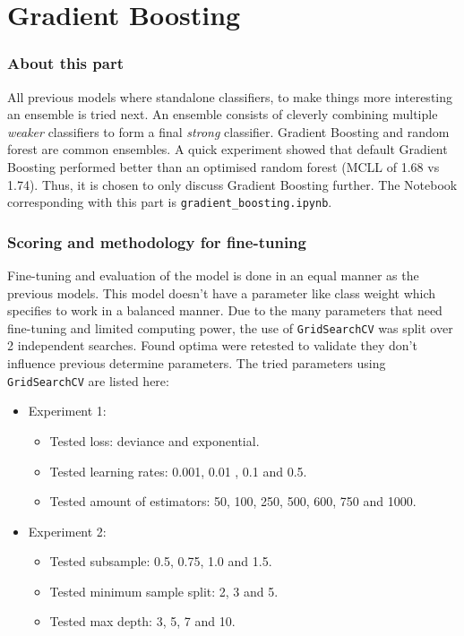 \part{Gradient Boosting}
\label{part:gradien_boost}


\section{About this part}
\label{section:gb_about_part}

All previous models where standalone classifiers, to make things more interesting an ensemble is tried next.
An ensemble consists of cleverly combining multiple \textit{weaker} classifiers to form a final \textit{strong} classifier.
Gradient Boosting and random forest are common ensembles.
A quick experiment showed that default Gradient Boosting performed better than an optimised random forest (MCLL of 1.68 vs 1.74).
Thus, it is chosen to only discuss Gradient Boosting further.
The Notebook corresponding with this part is \texttt{gradient\_boosting.ipynb}.


\section{Scoring and methodology for fine-tuning}
\label{section:gb_methodology}

Fine-tuning and evaluation of the model is done in an equal manner as the previous models.
This model doesn't have a parameter like class weight which specifies to work in a balanced manner.
Due to the many parameters that need fine-tuning and limited computing power, the use of \texttt{GridSearchCV} was split over 2 independent searches.
Found optima were retested to validate they don't influence previous determine parameters.
The tried parameters using \texttt{GridSearchCV} are listed here:
\begin{itemize}
    \item Experiment 1:
    \begin{itemize}
        \item Tested loss: deviance and exponential.
        \item Tested learning rates: 0.001, 0.01 , 0.1 and 0.5.
        \item Tested amount of estimators: 50, 100, 250, 500, 600, 750 and 1000.
    \end{itemize}
    \item Experiment 2:
    \begin{itemize}
        \item Tested subsample: 0.5, 0.75, 1.0 and 1.5.
        \item Tested minimum sample split: 2, 3 and 5.
        \item Tested max depth: 3, 5, 7 and 10.
    \end{itemize}
\end{itemize}

